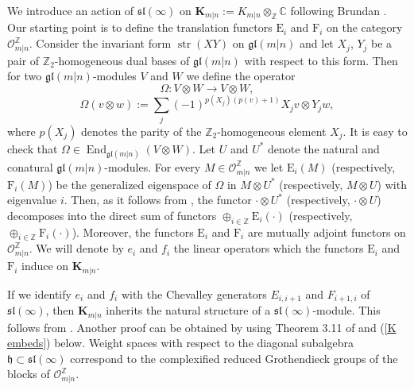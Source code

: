 \documentclass[12pt,oneside,english]{amsart}
\numberwithin{equation}{section}
\numberwithin{figure}{section}
\theoremstyle{plain}
\theoremstyle{plain}
\theoremstyle{remark}
\theoremstyle{definition}
\theoremstyle{plain}
\theoremstyle{remark}
\theoremstyle{definition}
\theoremstyle{plain}
\theoremstyle{plain}
\theoremstyle{definition}
\newcommand{\bK}{\mathbf{K}}
\begin{document}
We introduce an action of $\mathfrak{sl}(\infty)$ on $\bK_{m|n}:= K_{m|n}\otimes_{\mathbb Z}\mathbb C$ following Brundan \cite{B}.
Our starting point is to define the translation functors $\mathrm{E}_i$ and $\mathrm{F}_i$ on the category $\mathcal{O}_{m|n}^{\mathbb{Z}}$.
Consider the invariant form $\operatorname{str}(XY)$ on $\mathfrak{gl}\left(m|n\right)$ and let $X_j$, $Y_j$ be a pair of $\mathbb Z_2$-homogeneous dual bases of $\mathfrak{gl}(m|n)$ with respect to this form.
Then for two $\mathfrak{gl}\left(m|n\right)$-modules $V$ and $W$ we define the operator $$\Omega:V\otimes W\to V\otimes W,$$
$$\Omega(v\otimes w):=\sum_j(-1)^{p(X_j)(p(v)+1)}X_j v\otimes Y_j w,$$
where $p(X_j)$ denotes the parity of the $\mathbb Z_2$-homogeneous element $X_j$.
It is easy to check that $\Omega\in\operatorname{End}_{\mathfrak{gl}\left(m|n\right)}(V\otimes W)$.
Let $U$ and $U^*$ denote the natural and conatural $\mathfrak{gl}\left(m|n\right)$-modules. For every $M\in\mathcal{O}_{m|n}^{\mathbb{Z}}$ we let $\mathrm{E}_i(M)$
(respectively, $\mathrm{F}_i(M)$) be the
generalized eigenspace of $\Omega$ in $M\otimes U^*$ (respectively, $M\otimes U$) with eigenvalue $i$.
Then, as it follows from \cite{BLW}, the functor $\cdot\otimes U^*$ (respectively, $\cdot\otimes U$) decomposes into the direct sum of functors $\oplus_{i\in\mathbb Z}\mathrm{E}_i(\cdot)$ (respectively,
$\oplus_{i\in\mathbb Z}\mathrm{F}_i(\cdot)$). Moreover, the functors $\mathrm{E}_i$ and $\mathrm{F}_i$ are mutually adjoint functors on $\mathcal{O}_{m|n}^{\mathbb{Z}}$.
 We will denote by $e_i$ and $f_i$ the linear operators which the functors $\mathrm{E}_i$ and
$\mathrm{F}_i$ induce on $\bK_{m|n}$.


If we identify $e_i$ and $f_i$ with the Chevalley generators $E_{i,i+1}$ and $F_{i+1,i}$ of  $\mathfrak{sl}(\infty)$, then $\bK_{m|n}$ inherits the natural structure of a
$\mathfrak{sl}(\infty)$-module. This follows from \cite{B,BLW}. Another proof can be obtained by using Theorem 3.11 of \cite{CS} and (\ref{K embeds}) below.  Weight spaces with respect to the diagonal subalgebra $\mathfrak h \subset \mathfrak{sl}(\infty)$ correspond to the complexified reduced Grothendieck groups of the blocks of $\mathcal{O}_{m|n}^{\mathbb{Z}}$.
\end{document}
